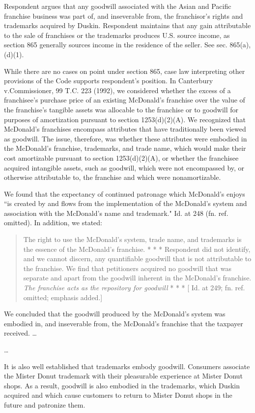 \begin{select}
Respondent argues that any goodwill associated with the Asian and Pacific franchise business was part of, and inseverable from, the franchisor's rights and trademarks acquired by Duskin. Respondent maintains that any gain attributable to the sale of franchises or the trademarks produces U.S. source income, as section 865 generally sources income in the residence of the seller. See sec. 865(a), (d)(1).

While there are no cases on point under section 865, case law interpreting other provisions of the Code supports
respondent's position. In Canterbury v.\@ Commissioner, 99 T.C. 223 (1992), we considered whether the excess of a
franchisee's purchase price of an existing McDonald's franchise over the value of the franchise's tangible assets was
allocable to the franchise or to goodwill for purposes of amortization pursuant to section 1253(d)(2)(A). We recognized
that McDonald's franchises encompass attributes that have traditionally been viewed as goodwill. The issue, therefore,
was whether these attributes were embodied in the McDonald's franchise, trademarks, and trade name, which would
make their cost amortizable pursuant to section 1253(d)(2)(A), or whether the franchisee acquired intangible assets,
such as goodwill, which were not encompassed by, or otherwise attributable to, the franchise and which were
nonamortizable.

We found that the expectancy of continued patronage which McDonald's enjoys ``is created by and flows from the
implementation of the McDonald's system and association with the McDonald's name and trademark." Id. at 248 (fn. ref.
omitted). In addition, we stated:
\begin{quote}
The right to use the McDonald's system, trade name, and trademarks is the essence of the McDonald's
franchise. * * * Respondent did not identify, and we cannot discern, any quantifiable goodwill that is not
attributable to the franchise. We find that petitioners acquired no goodwill that was separate and apart from
the goodwill inherent in the McDonald's franchise.\\
\textit{The franchise acts as the repository for goodwill} * * * [ Id. at 249; fn. ref. omitted; emphasis added.]
\end{quote}
We concluded that the goodwill produced by the McDonald's system was embodied in, and inseverable from, the
McDonald's franchise that the taxpayer received. \ldots

\ldots

It is also well established that trademarks embody goodwill. Consumers associate the Mister Donut trademark with their pleasurable
experience at Mister Donut shops. As a result, goodwill is also embodied in the trademarks, which Duskin acquired and
which cause customers to return to Mister Donut shops in the future and patronize them.


\end{select}
